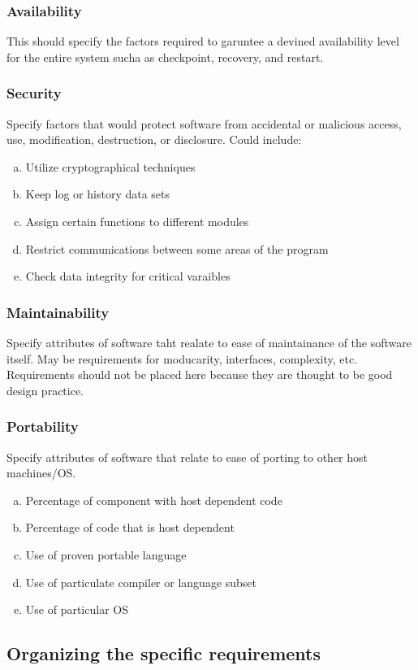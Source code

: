 \documentclass[10pt]{article}
\begin{document}
          \subsubsection{Availability}
          This should specify the factors required to garuntee a devined availability level for the entire system sucha as checkpoint, recovery, and restart.
          
          \subsubsection{Security}
          Specify factors that would protect software from accidental or malicious access, use, modification, destruction, or disclosure. Could include:

          \begin{enumerate}[(a)]
          \item{Utilize cryptographical techniques}
          \item{Keep log or history data sets}
          \item{Assign certain functions to different modules}
          \item{Restrict communications between some areas of the program}
          \item{Check data integrity for critical varaibles}
          \end{enumerate}
          
          \subsubsection{Maintainability}
          Specify attributes of software taht realate to ease of maintainance of the software itself. May be requirements for moducarity, interfaces, complexity, etc. Requirements should not be placed here because they are thought to be good design practice.

          \subsubsection{Portability}
          Specify attributes of software that relate to ease of porting to other host machines/OS. 

          \begin{enumerate}[(a)]
          \item{Percentage of component with host dependent code}
          \item{Percentage of code that is host dependent}
          \item{Use of proven portable language}
          \item{Use of particulate compiler or language subset}
          \item{Use of particular OS}
          \end{enumerate}

          
     \subsection{Organizing the specific requirements}
     
    
     
\end{document}
